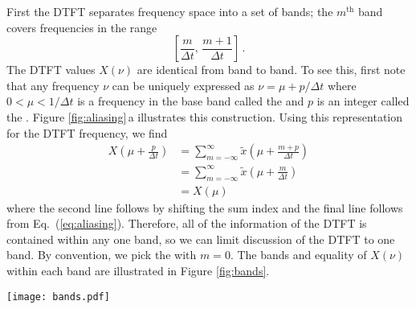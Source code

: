 First the DTFT separates frequency space into a set of bands; the $m^\text{th}$ band covers frequencies in the range
\begin{equation}
\left[ \frac{m}{\Delta t}, \, \frac{m+1}{\Delta t} \right] \, . \nonumber
\end{equation}
The DTFT values $X(\nu)$ are identical from band to band.
To see this, first note that any frequency $\nu$ can be uniquely expressed as $\nu = \mu + p / \Delta t$ where \mbox{$0 < \mu < 1/\Delta t$} is a frequency in the base band called the  and $p$ is an integer called the .
Figure \ref{fig:aliasing}\,a illustrates this construction.
Using this representation for the DTFT frequency, we find
\begin{align}
  X \left(\mu + \frac{p}{\Delta t} \right) \nonumber
  &= \sum_{m=-\infty}^\infty \tilde{x}	\left(\mu + \frac{m + p}{\Delta t} \right) \nonumber \\
  &= \sum_{m=-\infty}^\infty \tilde{x}	\left(\mu + \frac{m}{\Delta t} \right) \nonumber \\
  &= X(\mu)
\end{align}
where the second line follows by shifting the sum index and the final line follows from Eq.~(\ref{eq:aliasing}).
Therefore, all of the information of the DTFT is contained within any one band, so we can limit discussion of the DTFT to one band.
By convention, we pick the  with $m=0$.
The bands and equality of $X(\nu)$ within each band are illustrated in Figure \ref{fig:bands}.


\begin{figure*}[t]
  \begin{centering}
    \texttt{[image: bands.pdf]}
  \par\end{centering}
  \caption{The DTFT produces bands of with $1/\Delta t$. For \emph{any} $x_n$, the values of $X(\nu)$ within each band are identical.}
  \label{fig:bands}
\end{figure*}

